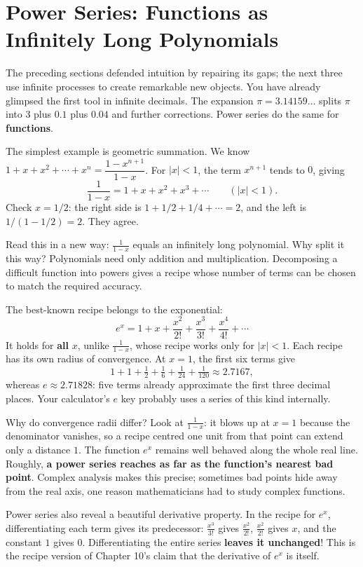 \section{Power Series: Functions as Infinitely Long Polynomials}

The preceding sections defended intuition by repairing its gaps; the next three use infinite processes to create remarkable new objects. You have already glimpsed the first tool in infinite decimals. The expansion $\pi=3.14159\dots$ splits $\pi$ into $3$ plus $0.1$ plus $0.04$ and further corrections. Power series do the same for \textbf{functions}.

The simplest example is geometric summation. We know $1+x+x^2+\cdots+x^n=\dfrac{1-x^{n+1}}{1-x}$. For $|x|<1$, the term $x^{n+1}$ tends to $0$, giving
\[
\frac{1}{1-x}=1+x+x^2+x^3+\cdots \qquad(|x|<1).
\]
Check $x=1/2$: the right side is $1+1/2+1/4+\cdots=2$, and the left is $1/(1-1/2)=2$. They agree.

Read this in a new way: $\frac{1}{1-x}$ equals an infinitely long polynomial. Why split it this way? Polynomials need only addition and multiplication. Decomposing a difficult function into powers gives a recipe whose number of terms can be chosen to match the required accuracy.

The best-known recipe belongs to the exponential:
\[
e^x=1+x+\frac{x^2}{2!}+\frac{x^3}{3!}+\frac{x^4}{4!}+\cdots
\]
It holds for \textbf{all} $x$, unlike $\frac{1}{1-x}$, whose recipe works only for $|x|<1$. Each recipe has its own radius of convergence. At $x=1$, the first six terms give
\[
1+1+\tfrac12+\tfrac16+\tfrac1{24}+\tfrac1{120}\approx 2.7167,
\]
whereas $e\approx 2.71828$: five terms already approximate the first three decimal places. Your calculator's $e$ key probably uses a series of this kind internally.

Why do convergence radii differ? Look at $\frac{1}{1-x}$: it blows up at $x=1$ because the denominator vanishes, so a recipe centred one unit from that point can extend only a distance $1$. The function $e^x$ remains well behaved along the whole real line. Roughly, \textbf{a power series reaches as far as the function's nearest bad point}. Complex analysis makes this precise; sometimes bad points hide away from the real axis, one reason mathematicians had to study complex functions.

Power series also reveal a beautiful derivative property. In the recipe for $e^x$, differentiating each term gives its predecessor: $\frac{x^3}{3!}$ gives $\frac{x^2}{2!}$, $\frac{x^2}{2!}$ gives $x$, and the constant $1$ gives $0$. Differentiating the entire series \textbf{leaves it unchanged}! This is the recipe version of Chapter 10's claim that the derivative of $e^x$ is itself.


